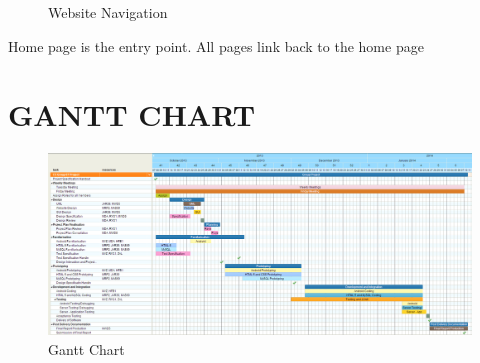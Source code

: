 \documentclass[12pt]{article}
\begin{document}
{\begin{figure}[htp]
\begin{adjustwidth}{-3cm}{-3cm}
\caption{Website Navigation}
\label{Website Navigation}
\end{adjustwidth}
\end{figure}

\par{Home page is the entry point. All pages link back to the home page}
\newpage
\section{GANTT CHART}
\begin{landscape}
	\begin{figure}[htp]
	\begin{adjustwidth}{-0.7cm}{0cm}
\centering
\includegraphics[scale=0.58]{Project_Plan/docs/gant_chart_01.PNG}
\caption{Gantt Chart}
\label{Gantt Chart}
\end{adjustwidth}
\end{figure}
\end{landscape}
\restoregeometry
\newpage
}
\end{document}
